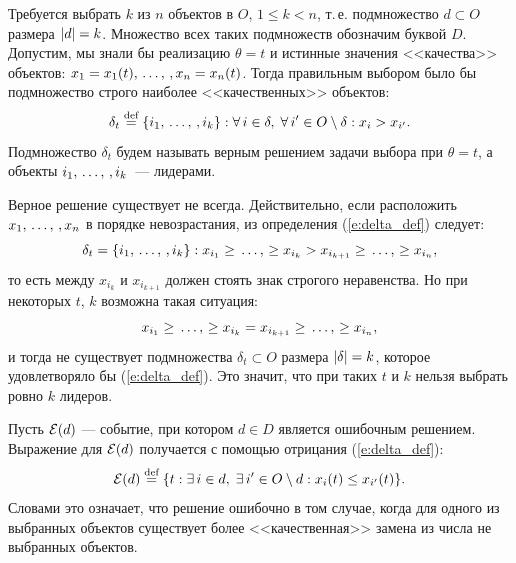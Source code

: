 Требуется выбрать $k$ из $n$ объектов в $O$, $1 \leq k < n$, т.\,е. подмножество $d \subset O$ размера $\left| d \right| = k$. Множество всех таких подмножеств обозначим буквой $D$. Допустим, мы знали бы реализацию $\theta = t$ и истинные значения <<качества>> объектов: $x_1 = x_1(t), \, \ldots,\,, x_n = x_n(t)$. Тогда правильным выбором было бы подмножество строго наиболее <<качественных>> объектов:
\begin{equation}
    \label{e:delta_def}
    \delta_{t} \overset{\text{def}}{=} \{i_1, \, \ldots,\,, i_k\}: \forall\, i \in \delta,\; \forall\, i' \in O \setminus \delta: x_i > x_{i'}. 
\end{equation}
Подмножество $\delta_{t}$ будем называть верным решением задачи выбора {} при $\theta = t$, а объекты $i_1, \, \ldots,\,, i_k$~--- лидерами. %

Верное решение существует не всегда. Действительно, если расположить $x_1, \, \ldots,\,, x_n$ в порядке невозрастания, из определения (\ref{e:delta_def}) следует:
\begin{equation}
   \label{e:right_order_strict}
    \delta_t = \{i_1, \, \ldots,\,, i_k\}: x_{i_1} \geq \, \ldots,\, \geq x_{i_k} > x_{i_{k+1}} \geq \, \ldots,\, \geq x_{i_n},   
\end{equation}
то есть между $x_{i_k}$ и $x_{i_{k+1}}$ должен стоять знак строгого неравенства. Но при некоторых $t$, $k$ возможна такая ситуация:
\begin{equation}
    \label{e:right_order_fail}
    x_{i_1} \geq \, \ldots,\, \geq x_{i_k} = x_{i_{k+1}} \geq \, \ldots,\, \geq x_{i_n},    
\end{equation}
и тогда не существует подмножества $\delta_t \subset O$ размера $\left| \delta \right| = k$, которое  удовлетворяло бы (\ref{e:delta_def}). Это значит, что при таких $t$ и $k$ нельзя выбрать ровно $k$ лидеров. 

Пусть $\mathcal{E}(d)$ --- событие, при котором $d \in D$ является ошибочным решением. Выражение для $\mathcal{E}(d)$ получается с помощью отрицания (\ref{e:delta_def}):
\begin{equation}
  \label{e:Eps_d_def}
  \mathcal{E}(d) \overset{\text{def}}{=} \{t: \exists\, i \in d,\; \exists\, i' \in O \setminus d: x_i(t) \leq x_{i'}(t)\}.
\end{equation}
Словами это означает, что решение ошибочно в том случае, когда для одного из выбранных объектов существует более <<качественная>> замена из числа не выбранных объектов.

